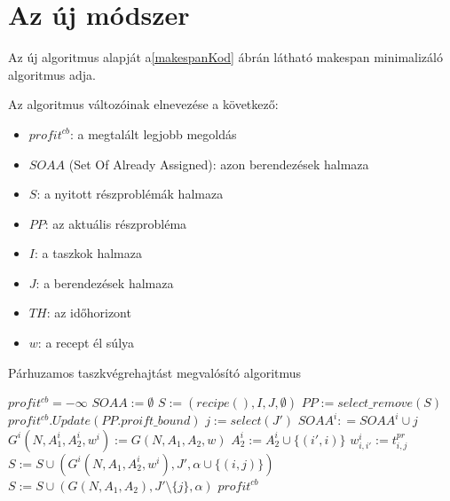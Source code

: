 \chapter{Az új módszer}
Az új algoritmus alapját a\ref{makespanKod} ábrán látható makespan minimalizáló algoritmus adja. 

Az algoritmus változóinak elnevezése a következő:
\begin{itemize}
	\item $profit^{cb}$: a megtalált legjobb megoldás
	\item $SOAA$ (Set Of Already Assigned): azon berendezések halmaza
	\item $S$: a nyitott részproblémák halmaza
	\item $PP$: az aktuális részprobléma
	\item $I$: a taszkok halmaza
	\item $J$: a berendezések halmaza
	\item $TH$: az időhorizont
	\item $w$: a recept él súlya
\end{itemize}

\begin{algorithm}[H]
\caption{Párhuzamos taszkvégrehajtást megvalósító algoritmus}
\begin{algorithmic}[1]
	\State $profit^{cb} = -\infty$
	\State $SOAA:= \emptyset$
	\State $S:= {(recipe(),I,J,\emptyset)}$
		\State $PP:= select\_remove(S)$
					\State $profit^{cb}.Update(PP.proift\_bound)$
				\Else
					\State $j:=select(J')$
						\State $SOAA^i: = SOAA^i\cup j$
						\State $G^i(N,A_1^i,A_2^i,w^i):= G(N,A_1,A_2,w)$
							\State $A_2^i:= A_2^i \cup \{(i',i)\}$				
						\EndFor
							\State $w_{i,i'}^i:= t_{i,j}^{pr}$
						\EndFor
						\State $S:= S \cup (G^i(N,A_1,A_2^i,w^i),J',\alpha \cup \{(i,j)\})$
					\EndFor
						\State $S:= S \cup (G(N,A_1,A_2),J'\setminus\{j\},\alpha)$
					\EndIf
				\EndIf
			\EndIf
		\EndIf
	\EndWhile
	\State \Return $profit^{cb}$
\EndProcedure
\end{algorithmic}
\end{algorithm}